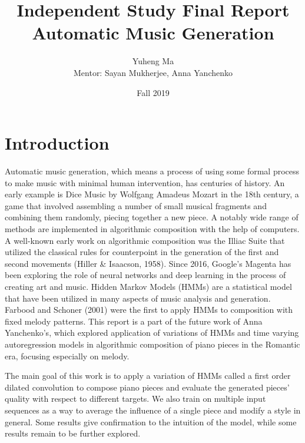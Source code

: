 \documentclass[10pt, oneside]{article}
\title{
Independent Study Final Report\\
\Large Automatic Music Generation \\
}
\author{Yuheng Ma\\[0.3cm]{ Mentor: Sayan Mukherjee, Anna Yanchenko}}
\date{Fall 2019}
\begin{document}
\maketitle

\vspace{.25in}

\section{Introduction}
Automatic music generation, which means a process of using some formal process to make music with minimal human intervention\cite{briefhistoryofac}, has centuries of history. An early example is Dice Music by Wolfgang Amadeus Mozart\cite{algorithmiccomposition} in the 18th century, a game that involved assembling a number of small musical fragments and combining them randomly, piecing together a new piece. A notably wide range of methods are implemented in algorithmic composition with the help of computers. A well-known early work on algorithmic composition was the Illiac Suite that utilized the classical rules for counterpoint in the generation of the first and second movements (Hiller \& Isaacson, 1958)\cite{AImethodsinalgorithmicomposing}. Since 2016, Google's Magenta\cite{magenta} has been exploring the role of neural networks and deep learning  in the process of creating art and music. Hidden Markov Models (HMMs) are a statistical model that have been utilized in many aspects of music analysis and generation. Farbood and Schoner (2001) \cite{farbood2001analysis} were the first to apply HMMs to composition with fixed melody patterns. This report is a part of the future work of Anna Yanchenko's\cite{yanchenko2017classical}, which explored application of variations of HMMs and time varying autoregression models in algorithmic composition of piano pieces in the Romantic era, focusing especially on melody.

The main goal of this work is to apply a variation of HMMs called a first order dilated convolution to compose piano pieces and evaluate the generated pieces' quality with respect to different targets. We also train on multiple input sequences as a way to average the influence of a single piece and modify a style in general. Some results give confirmation to the intuition of the model, while some results remain to be further explored.
\end{document}
